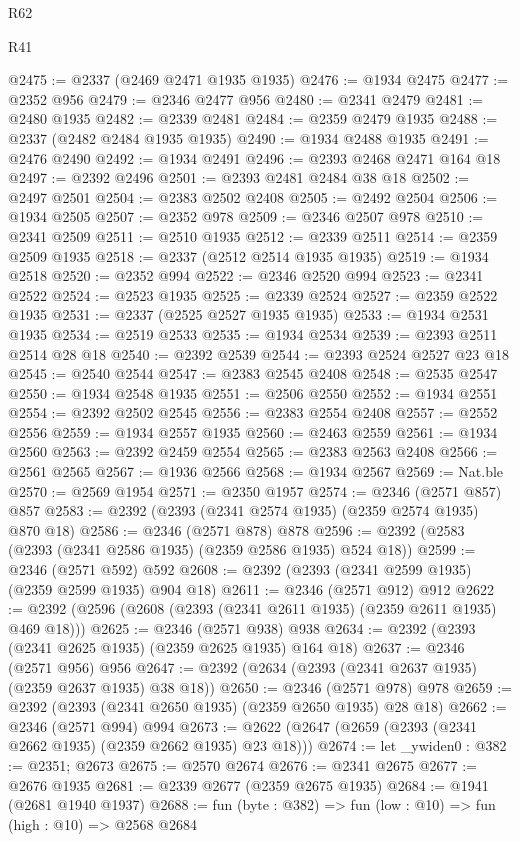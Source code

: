 \begin{lexlean}{R62}
\begin{lexlean}{R41}
\begin{coremodule}
{{{{{{{{{{{{{{{{{{{{{{{{{{{{{{{{{{{{{{{{{{{{{{{{{{{{{{{{{{{{{{{{{{{{{{{{{{{{{{{{{{{{{{{@2475 := @2337 (@2469 @2471 @1935 @1935)
@2476 := @1934 @2475
@2477 := @2352 @956
@2479 := @2346 @2477 @956
@2480 := @2341 @2479
@2481 := @2480 @1935
@2482 := @2339 @2481
@2484 := @2359 @2479 @1935
@2488 := @2337 (@2482 @2484 @1935 @1935)
@2490 := @1934 @2488 @1935
@2491 := @2476 @2490
@2492 := @1934 @2491
@2496 := @2393 @2468 @2471 @164 @18
@2497 := @2392 @2496
@2501 := @2393 @2481 @2484 @38 @18
@2502 := @2497 @2501
@2504 := @2383 @2502 @2408
@2505 := @2492 @2504
@2506 := @1934 @2505
@2507 := @2352 @978
@2509 := @2346 @2507 @978
@2510 := @2341 @2509
@2511 := @2510 @1935
@2512 := @2339 @2511
@2514 := @2359 @2509 @1935
@2518 := @2337 (@2512 @2514 @1935 @1935)
@2519 := @1934 @2518
@2520 := @2352 @994
@2522 := @2346 @2520 @994
@2523 := @2341 @2522
@2524 := @2523 @1935
@2525 := @2339 @2524
@2527 := @2359 @2522 @1935
@2531 := @2337 (@2525 @2527 @1935 @1935)
@2533 := @1934 @2531 @1935
@2534 := @2519 @2533
@2535 := @1934 @2534
@2539 := @2393 @2511 @2514 @28 @18
@2540 := @2392 @2539
@2544 := @2393 @2524 @2527 @23 @18
@2545 := @2540 @2544
@2547 := @2383 @2545 @2408
@2548 := @2535 @2547
@2550 := @1934 @2548 @1935
@2551 := @2506 @2550
@2552 := @1934 @2551
@2554 := @2392 @2502 @2545
@2556 := @2383 @2554 @2408
@2557 := @2552 @2556
@2559 := @1934 @2557 @1935
@2560 := @2463 @2559
@2561 := @1934 @2560
@2563 := @2392 @2459 @2554
@2565 := @2383 @2563 @2408
@2566 := @2561 @2565
@2567 := @1936 @2566
@2568 := @1934 @2567
@2569 := Nat.ble
@2570 := @2569 @1954
@2571 := @2350 @1957
@2574 := @2346 (@2571 @857) @857
@2583 := @2392 (@2393 (@2341 @2574 @1935) (@2359 @2574 @1935) @870 @18)
@2586 := @2346 (@2571 @878) @878
@2596 := @2392 (@2583 (@2393 (@2341 @2586 @1935) (@2359 @2586 @1935) @524 @18))
@2599 := @2346 (@2571 @592) @592
@2608 := @2392 (@2393 (@2341 @2599 @1935) (@2359 @2599 @1935) @904 @18)
@2611 := @2346 (@2571 @912) @912
@2622 := @2392 (@2596 (@2608 (@2393 (@2341 @2611 @1935) (@2359 @2611 @1935) @469 @18)))
@2625 := @2346 (@2571 @938) @938
@2634 := @2392 (@2393 (@2341 @2625 @1935) (@2359 @2625 @1935) @164 @18)
@2637 := @2346 (@2571 @956) @956
@2647 := @2392 (@2634 (@2393 (@2341 @2637 @1935) (@2359 @2637 @1935) @38 @18))
@2650 := @2346 (@2571 @978) @978
@2659 := @2392 (@2393 (@2341 @2650 @1935) (@2359 @2650 @1935) @28 @18)
@2662 := @2346 (@2571 @994) @994
@2673 := @2622 (@2647 (@2659 (@2393 (@2341 @2662 @1935) (@2359 @2662 @1935) @23 @18)))
@2674 := let _ywiden0 : @382 := @2351; @2673
@2675 := @2570 @2674
@2676 := @2341 @2675
@2677 := @2676 @1935
@2681 := @2339 @2677 (@2359 @2675 @1935)
@2684 := @1941 (@2681 @1940 @1937)
@2688 := fun (byte : @382) => fun (low : @10) => fun (high : @10) => @2568 @2684
}}}}}}}}}}}}}}}}}}}}}}}}}}}}}}}}}}}}}}}}}}}}}}}}}}}}}}}}}}}}}}}}}}}}}}}}}}}}}}}}}}}}}}}
\end{coremodule}
\end{lexlean}
\end{lexlean}

